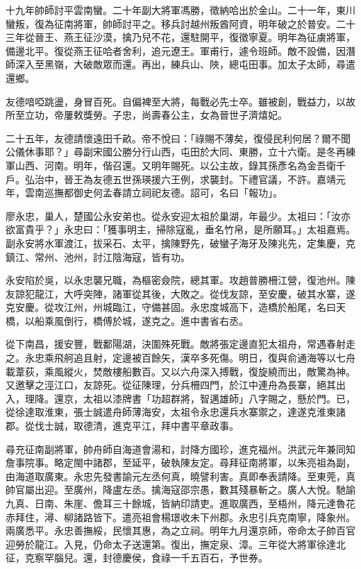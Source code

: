 \begin{pinyinscope}
十九年帥師討平雲南蠻。二十年副大將軍馮勝，徵納哈出於金山。二十一年，東川蠻叛，復為征南將軍，帥師討平之。移兵討越州叛酋阿資，明年破之於普安。二十三年從晉王、燕王征沙漠，擒乃兒不花，還駐開平，復徵寧夏。明年為征虜將軍，備邊北平。復從燕王征哈者舍利，追元遼王。軍甫行，遽令班師。敵不設備，因潛師深入至黑嶺，大破敵眾而還。再出，練兵山、陜，總屯田事。加太子太師，尋遣還鄉。

友德喑啞跳盪，身冒百死。自偏裨至大將，每戰必先士卒。雖被創，戰益力，以故所至立功，帝屢敕獎勞。子忠，尚壽春公主，女為晉世子濟熺妃。

二十五年，友德請懷遠田千畝。帝不悅曰：「祿賜不薄矣，復侵民利何居？爾不聞公儀休事耶？」尋副宋國公勝分行山西，屯田於大同、東勝，立十六衛。是冬再練軍山西、河南。明年，偕召還。又明年賜死。以公主故，錄其孫彥名為金吾衛千戶。弘治中，晉王為友德五世孫瑛援六王例，求襲封。下禮官議，不許。嘉靖元年，雲南巡撫都御史何孟春請立祠祀友德。詔可，名曰「報功」。

廖永忠，巢人，楚國公永安弟也。從永安迎太祖於巢湖，年最少。太祖曰：「汝亦欲富貴乎？」永忠曰：「獲事明主，掃除寇亂，垂名竹帛，是所願耳。」太祖嘉焉。副永安將水軍渡江，拔采石、太平，擒陳野先，破蠻子海牙及陳兆先，定集慶，克鎮江、常州、池州，討江陰海寇，皆有功。

永安陷於吳，以永忠襲兄職，為樞密僉院，總其軍。攻趙普勝柵江營，復池州。陳友諒犯龍江，大呼突陣，諸軍從其後，大敗之。從伐友諒，至安慶，破其水寨，遂克安慶。從攻江州，州城臨江，守備甚固。永忠度城高下，造橋於船尾，名曰天橋，以船乘風倒行，橋傅於城，遂克之。進中書省右丞。

從下南昌，援安豐，戰鄱陽湖，決圍殊死戰。敵將張定邊直犯太祖舟，常遇春射走之。永忠乘飛舸追且射，定邊被百餘矢，漢卒多死傷。明日，復與俞通海等以七舟載葦荻，乘風縱火，焚敵樓船數百。又以六舟深入搏戰，復旋繞而出，敵驚為神。又邀擊之涇江口，友諒死。從征陳理，分兵柵四門，於江中連舟為長寨，絕其出入，理降。還京，太祖以漆牌書「功超群將，智邁雄師」八字賜之，懸於門。已，從徐達取淮東，張士誠遣舟師薄海安，太祖令永忠還兵水寨禦之，達遂克淮東諸郡。從伐士誠，取德清，進克平江，拜中書平章政事。

尋充征南副將軍，帥舟師自海道會湯和，討降方國珍，進克福州。洪武元年兼同知詹事院事。略定閩中諸郡，至延平，破執陳友定。尋拜征南將軍，以朱亮祖為副，由海道取廣東。永忠先發書諭元左丞何真，曉譬利害。真即奉表請降。至東莞，真帥官屬出迎。至廣州，降盧左丞。擒海寇邵宗愚，數其殘暴斬之。廣人大悅。馳諭九真、日南、朱崖、儋耳三十餘城，皆納印請吏。進取廣西，至梧州，降元達魯花赤拜住，潯、柳諸路皆下。遣亮祖會楊璟收未下州郡。永忠引兵克南寧，降象州。兩廣悉平。永忠善撫綏，民懷其惠，為之立祠。明年九月還京師，帝命太子帥百官迎勞於龍江。入見，仍命太子送還第。復出，撫定泉、漳。三年從大將軍徐達北征，克察罕腦兒。還，封德慶侯，食祿一千五百石，予世券。


\end{pinyinscope}
